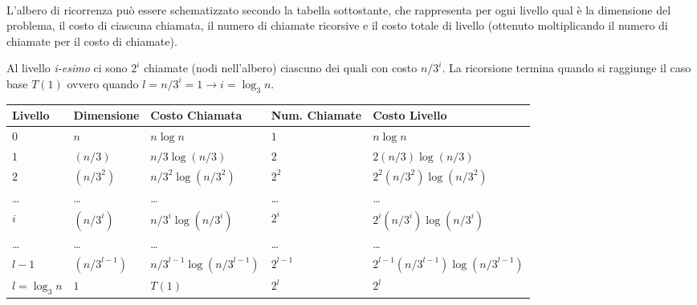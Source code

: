 \documentclass{article}
\begin{document}
\mbox{}\\
L'albero di ricorrenza può essere schematizzato secondo la tabella sottostante, che rappresenta per ogni livello qual è la dimensione del problema, il costo di ciascuna chiamata, il numero di chiamate ricorsive e il costo totale di livello (ottenuto moltiplicando il numero di chiamate per il costo di chiamate).

Al livello \textit{i-esimo} ci sono $2^i$ chiamate (nodi nell'albero) ciascuno dei quali con costo $n/3^i$. La ricorsione termina quando si raggiunge il caso base $T(1)$ ovvero quando $l = n/3^i = 1 \rightarrow i = \log_3 n$.

\begin{center}
    \begin{tabular}{| C{1.5cm} | C{1.7cm} | C{2.7cm} | C{1.5cm} | C{3.6cm} |}
        \hline
        Livello & Dimensione &  Costo Chiamata & Num. Chiamate & Costo Livello \\
        \hline\hline
        $0$ & $n$ & $n \log n$ & $1$ & $n \log n$\\
        \hline
        $1$ & $(n/3)$ & $n/3 \log (n/3)$ & $2$ & $2 (n/3) \log (n/3)$\\[7pt]
        \hline
        $2$ & $(n/3^2)$ & $n/3^2 \log (n/3^2)$ & $2^2$ & $2^2 (n/3^2) \log (n/3^2)$\\[7pt]
        \hline
        \dots & \dots & \dots & \dots & \dots \\
        \hline
        $i$ & $(n/3^i)$ & $n/3^i \log (n/3^i)$ & $2^i$ & $2^i (n/3^i) \log (n/3^i)$\\[7pt]
        \hline
        \dots & \dots & \dots & \dots & \dots \\
        \hline
        $l-1$ & $(n/3^{l-1})$ & $n/3^{l-1} \log (n/3^{l-1})$ & $2^{l-1}$ & $2^{l-1}(n/3^{l-1}) \log (n/3^{l-1})$\\[7pt]
        \hline
        $l = \log_3 n$ & $1$ & $T(1)$ & $2^l$ & $2^l$\\[7pt]
        \hline
    \end{tabular}
\end{center}
\end{document}
